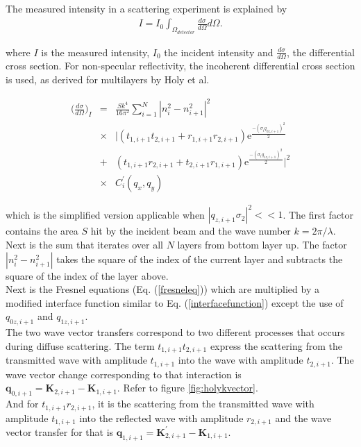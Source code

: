 The measured intensity in a scattering experiment is explained by
\begin{eqnarray}
	I = I_0 \int_{\Omega_{detector}} \frac{d\sigma}{d\Omega} d\Omega.
\end{eqnarray}

where $I$ is the measured intensity, $I_0$ the incident intensity and $\frac{d\sigma}{d\Omega}$, the differential cross section. For non-specular reflectivity, the incoherent differential cross section is used, as derived for multilayers by Holy et al.\cite{Holy:1993p5469}

\begin{eqnarray}\label{holyeq}
	\Bigg(\frac{d\sigma}{d\Omega}\Bigg)_I &=&\frac{Sk^4}{16\pi^2}\sum_{i=1}^N |n_{i}^2 - n_{i+1}^2|^2  \nonumber \\
	 &\times&|(t_{1,i+1}t_{2,i+1}+r_{1,i+1}r_{2,i+1})\mathrm{e}^{\frac{-(\sigma_i q_{0z,i+1})^2}{2}} \nonumber  \\
	 &+&(t_{1,i+1}r_{2,i+1}+t_{2,i+1}r_{1,i+1})\mathrm{e}^{\frac{-(\sigma_i q_{1z,i+1})^2}{2}}|^2 \\
  &\times& C_i^{'} (q_x,q_y)
\end{eqnarray}

which is the simplified version applicable when $|q_{z,i+1}\sigma_2|^2 << 1$. The first factor contains the area $S$ hit by the incident beam and the wave number $k = 2\pi/\lambda$. Next is the sum that iterates over all $N$ layers from bottom layer up. The factor $|n_{i}^2 - n_{i+1}^2|$ takes the square of the index of the current layer and subtracts the square of the index of the layer above.\\
Next is the Fresnel equations (Eq. (\ref{fresneleq})) which are multiplied by a modified interface function similar to Eq. (\ref{interfacefunction}) except the use of $q_{0z,i+1}$ and $q_{1z,i+1}$.\\
The two wave vector transfers correspond to two different processes that occurs during diffuse scattering. The term $t_{1,i+1}t_{2,i+1}$ express the scattering from the transmitted wave with amplitude $t_{1,i+1}$ into the wave with amplitude $t_{2,i+1}$. The wave vector change corresponding to that interaction is $\mathbf{q}_{0,i+1} = \mathbf{K}_{2,i+1}-\mathbf{K}_{1,i+1}$. Refer to figure \ref{fig:holykvector}.\\
And for $t_{1,i+1}r_{2,i+1}$, it is the scattering from the transmitted wave with amplitude $t_{1,i+1}$ into the reflected wave with amplitude $r_{2,i+1}$ and the wave vector transfer for that is $\mathbf{q}_{1,i+1} = \mathbf{K}_{2,i+1}^{'}-\mathbf{K}_{1,i+1}$.

